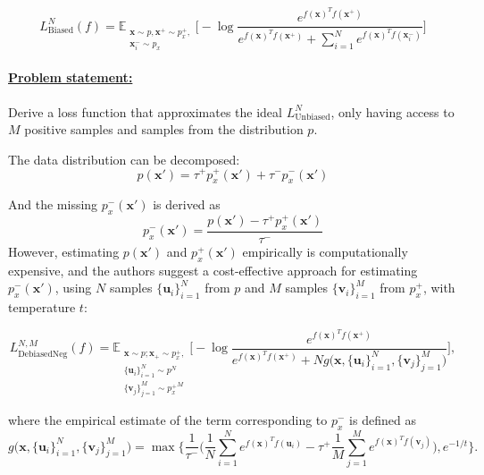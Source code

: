 \documentclass{article}
\begin{document}
\begin{equation} \label{eq:3}
L_{\text{Biased}}^N(f) = \mathbb{E}_{\substack{\textbf{x} \sim p, \textbf{x}^+ \sim p^+_x,\\ \textbf{x}_i^- \sim p_x}} \bigg[-\log \frac{e^{f(\textbf{x})^T f(\textbf{x}^+)}}{e^{f(\textbf{x})^T f(\textbf{x}^+)} + \sum _{i=1}^N e^{f(\textbf{x})^T f(\textbf{x}_i^-)}}\bigg]
\end{equation}

\paragraph{\underline{Problem statement:}} Derive a loss function that approximates the ideal $L_{\text{Unbiased}}^N$, only having access to $M$ positive samples and samples from the distribution $p$.

The data distribution can be decomposed:
\begin{equation} \label{eq:4}
p(\textbf{x}') = \tau^+ p^+_x(\textbf{x}') + \tau^-p_x^-(\textbf{x}')
\end{equation}

And the missing $p^-_x(\textbf{x}')$ is derived as
\begin{equation} \label{eq:5}
p_x^-(\textbf{x}') = \frac{p(\textbf{x}') - \tau^+ p^+_x(\textbf{x}')}{\tau^-}
\end{equation}
However, estimating $p(\textbf{x}')$ and $p^+_x(\textbf{x}')$ empirically is computationally expensive, and the authors suggest a cost-effective approach for estimating $p^-_x(\textbf{x}')$, using $N$ samples $\{\textbf{u}_i\}_{i=1}^N$ from $p$ and $M$ samples $\{\textbf{v}_i\}_{i=1}^M$ from $p_x^+$, with temperature $t$:

\begin{equation} \label{eq:6}
L_{\text{DebiasedNeg}}^{N, M} (f) = \mathbb{E}_{\substack{\textbf{x} \sim p; \textbf{x}_+ \sim p_x^+,\\ \{\textbf{u}_i\}_{i=1}^N \sim p^N \\ \{\textbf{v}_j\}_{j=1}^M \sim {p_x^+}^M}}  \bigg[ -\log \frac{e^{f(\textbf{x})^T f(\textbf{x}^+)} }{e^{f(\textbf{x})^T f(\textbf{x}^+)} + N g\big(\textbf{x}, \{\textbf{u}_i\}_{i=1}^N, \{\textbf{v}_j\}_{j=1}^M\big)} \bigg],
\end{equation}

where the empirical estimate of the term corresponding to $p_x^-$ is defined as
\begin{equation} \label{eq:7}
g\big(\textbf{x}, \{\textbf{u}_i\}_{i=1}^N, \{\textbf{v}_j\}_{j=1}^M\big) = \max \bigg\{ \frac{1}{\tau^-}\bigg(\frac{1}{N} \sum \limits_{i=1}^N e^{f(\textbf{x})^T f(\textbf{u}_i)} - \tau^+ \frac{1}{M} \sum \limits_{j=1}^M e^{f(\textbf{x})^T f(\textbf{v}_j)}\bigg), e^{-1/t}\bigg\}.
\end{equation}
\end{document}
